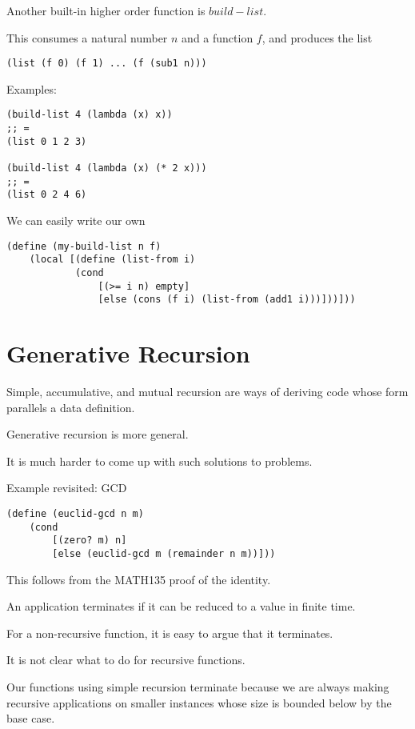 \documentclass{article}
\begin{document}
Another built-in higher order function is $build-list$. 

This consumes a natural number $n$ and a function $f$, and produces the list
\begin{lstlisting}
(list (f 0) (f 1) ... (f (sub1 n)))
\end{lstlisting}

Examples:
\begin{lstlisting}
(build-list 4 (lambda (x) x))
;; =
(list 0 1 2 3)

(build-list 4 (lambda (x) (* 2 x)))
;; =
(list 0 2 4 6)
\end{lstlisting}

We can easily write our own

\begin{lstlisting}
(define (my-build-list n f)
    (local [(define (list-from i)
            (cond
                [(>= i n) empty]
                [else (cons (f i) (list-from (add1 i)))]))]))
\end{lstlisting}


\section{Generative Recursion}

Simple, accumulative, and mutual recursion are ways of deriving code whose form parallels a data definition. 

Generative recursion is more general. 

It is much harder to come up with such solutions to problems. 

Example revisited: GCD

\begin{lstlisting}
(define (euclid-gcd n m)
    (cond
        [(zero? m) n]
        [else (euclid-gcd m (remainder n m))]))
\end{lstlisting}

This follows from the MATH135 proof of the identity. 

An application terminates if it can be reduced to a value in finite time. 

For a non-recursive function, it is easy to argue that it terminates. 

It is not clear what to do for recursive functions. 

Our functions using simple recursion terminate because we are always making recursive applications on smaller instances whose size is bounded below by the base case. 
\end{document}
